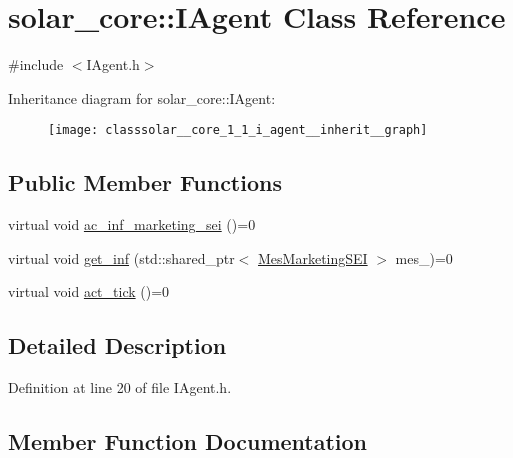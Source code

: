 \hypertarget{classsolar__core_1_1_i_agent}{}\section{solar\+\_\+core\+:\+:I\+Agent Class Reference}
\label{classsolar__core_1_1_i_agent}


{\ttfamily \#include $<$I\+Agent.\+h$>$}



Inheritance diagram for solar\+\_\+core\+:\+:I\+Agent\+:\nopagebreak
\begin{figure}[H]
\begin{center}
\leavevmode
\texttt{[image: classsolar\_\_core\_1\_1\_i\_agent\_\_inherit\_\_graph]}
\end{center}
\end{figure}
\subsection*{Public Member Functions}
\begin{DoxyCompactItemize}
\item 
virtual void \hyperlink{classsolar__core_1_1_i_agent_a0333116b8ef74f3321ce7acff5d5332e}{ac\+\_\+inf\+\_\+marketing\+\_\+sei} ()=0
\item 
virtual void \hyperlink{classsolar__core_1_1_i_agent_aa9ebc762ed032f7084063199747decb6}{get\+\_\+inf} (std\+::shared\+\_\+ptr$<$ \hyperlink{classsolar__core_1_1_mes_marketing_s_e_i}{Mes\+Marketing\+S\+E\+I} $>$ mes\+\_\+)=0
\item 
virtual void \hyperlink{classsolar__core_1_1_i_agent_a6813e8e4f94ab2dc917a29c4d6609149}{act\+\_\+tick} ()=0
\end{DoxyCompactItemize}


\subsection{Detailed Description}


Definition at line 20 of file I\+Agent.\+h.



\subsection{Member Function Documentation}
\hypertarget{classsolar__core_1_1_i_agent_a0333116b8ef74f3321ce7acff5d5332e}{}
